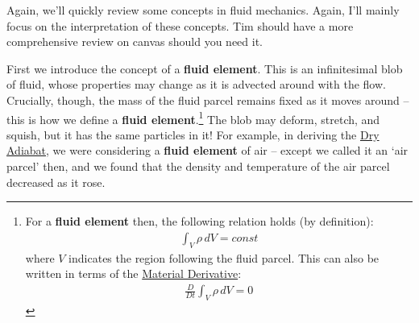 Again, we'll quickly review some concepts in fluid mechanics. Again, I'll mainly focus on the interpretation of these concepts. Tim should have a more comprehensive review on canvas should you need it.

First we introduce the concept of a \textbf{fluid element}. This is an infinitesimal blob of fluid, whose properties may change as it is advected around with the flow. Crucially, though, the mass of the fluid parcel remains fixed as it moves around -- this is how we define a \textbf{fluid element}.\footnote{
    For a \textbf{fluid element} then, the following relation holds (by definition):
    \begin{align*}
        \int_V \rho \, dV = const
    \end{align*}
    where \(V\) indicates the region following the fluid parcel. This can also be written in terms of the \hyperref[Material Derivative]{Material Derivative}:
    \begin{align*}
        \frac{D}{Dt}\int_V \rho \, dV=0
    \end{align*}
} The blob may deform, stretch, and squish, but it has the same particles in it! For example, in deriving the \hyperref[Dry Adiabat]{Dry Adiabat}, we were considering a \textbf{fluid element} of air -- except we called it an `air parcel' then, and we found that the density and temperature of the air parcel decreased as it rose.

